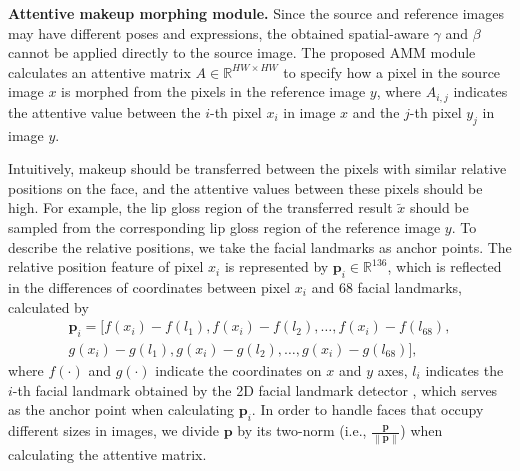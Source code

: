\textbf{Attentive makeup morphing module.} 
Since the source and reference images may have different poses and expressions, the obtained spatial-aware $\gamma$ and $\beta$ cannot be applied directly to the source image. The proposed AMM module calculates an attentive matrix $A \in \mathbb{R}^{HW \times HW}$ to specify how a pixel in the source image $x$ is morphed from the pixels in the reference image $y$, where $A_{i,j}$ indicates the attentive value between the $i$-th pixel $x_i$ in image $x$ and the $j$-th pixel $y_j$ in image $y$.

Intuitively, makeup should be transferred between the pixels with similar relative positions on the face, and the attentive values between these pixels should be high. For example, the lip gloss region of the transferred result $\tilde{x}$ should be sampled from the corresponding lip gloss region of the reference image $y$.
To describe the relative positions, we take the facial landmarks as anchor points. The relative position feature of pixel $x_i$ is represented by $\mathbf{p}_i \in \mathbb{R}^{136}$, which is reflected in the differences of coordinates between pixel $x_i$  and $68$ facial landmarks, calculated by
\begin{equation}
    \begin{split}
    \mathbf{p}_i= [f(x_i)-f(l_1), f(x_i)-f(l_2), \dots, f(x_i) - f(l_{68}),\\ g(x_i)-g(l_1), g(x_i)-g(l_2), \dots, g(x_i) - g(l_{68})],
    \label{p}
    \end{split}
\end{equation}
where $f(\cdot)$ and $g(\cdot)$ indicate the coordinates on $x$ and $y$ axes, $l_i$ indicates the $i$-th facial landmark obtained by the 2D facial landmark detector \cite{Zhang2016JointFD}, which serves as the anchor point when calculating $\mathbf{p}_i$. In order to handle faces that occupy different sizes in images, we divide $\mathbf{p}$ by its two-norm (i.e., $\frac{\mathbf{p}}{\left\| \mathbf{p} \right\|}$) when calculating the attentive matrix.

